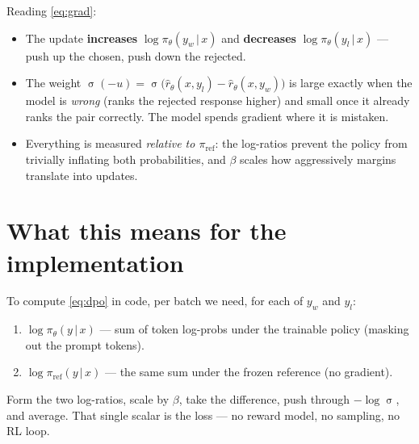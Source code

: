 \documentclass[11pt]{article}
\newcommand{\given}{\,\vert\,}
\newcommand{\pol}{\pi_{\theta}}          %
\newcommand{\piref}{\pi_{\mathrm{ref}}}  %
\newcommand{\yw}{y_w}                     %
\newcommand{\yl}{y_l}                     %
\DeclareMathOperator{\sigmoid}{\sigma}
\begin{document}
Reading \eqref{eq:grad}:
\begin{itemize}
  \item The update \textbf{increases} $\log \pol(\yw \given x)$ and
        \textbf{decreases} $\log \pol(\yl \given x)$ --- push up the chosen,
        push down the rejected.
  \item The weight $\sigmoid(-u) = \sigmoid\big(\hat r_\theta(x,\yl) - \hat
        r_\theta(x,\yw)\big)$ is large exactly when the model is \emph{wrong}
        (ranks the rejected response higher) and small once it already ranks
        the pair correctly. The model spends gradient where it is mistaken.
  \item Everything is measured \emph{relative to $\piref$}: the log-ratios prevent
        the policy from trivially inflating both probabilities, and $\beta$
        scales how aggressively margins translate into updates.
\end{itemize}

\section{What this means for the implementation}

To compute \eqref{eq:dpo} in code, per batch we need, for each of
$\yw$ and $\yl$:
\begin{enumerate}
  \item $\log \pol(y \given x)$ --- sum of token log-probs under the trainable
        policy (masking out the prompt tokens).
  \item $\log \piref(y \given x)$ --- the same sum under the frozen reference (no
        gradient).
\end{enumerate}
Form the two log-ratios, scale by $\beta$, take the difference, push through
$-\log\sigmoid$, and average. That single scalar is the loss --- no reward
model, no sampling, no RL loop.
\end{document}
